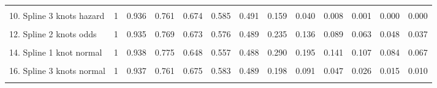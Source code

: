 \documentclass[
]{article}
\begin{document}
\begin{table}
{\begin{tabular}[t]{lrrrrrrrrrrrr}
\cellcolor{gray!6}{9. Spline 2 knots hazard} & \cellcolor{gray!6}{1} & \cellcolor{gray!6}{0.935} & \cellcolor{gray!6}{0.766} & \cellcolor{gray!6}{0.673} & \cellcolor{gray!6}{0.579} & \cellcolor{gray!6}{0.490} & \cellcolor{gray!6}{0.184} & \cellcolor{gray!6}{0.061} & \cellcolor{gray!6}{0.018} & \cellcolor{gray!6}{0.005} & \cellcolor{gray!6}{0.001} & \cellcolor{gray!6}{0.000}\\
10. Spline 3 knots hazard & 1 & 0.936 & 0.761 & 0.674 & 0.585 & 0.491 & 0.159 & 0.040 & 0.008 & 0.001 & 0.000 & 0.000\\
\cellcolor{gray!6}{11. Spline 1 knot odds} & \cellcolor{gray!6}{1} & \cellcolor{gray!6}{0.939} & \cellcolor{gray!6}{0.778} & \cellcolor{gray!6}{0.648} & \cellcolor{gray!6}{0.556} & \cellcolor{gray!6}{0.489} & \cellcolor{gray!6}{0.301} & \cellcolor{gray!6}{0.213} & \cellcolor{gray!6}{0.162} & \cellcolor{gray!6}{0.131} & \cellcolor{gray!6}{0.109} & \cellcolor{gray!6}{0.093}\\
12. Spline 2 knots odds & 1 & 0.935 & 0.769 & 0.673 & 0.576 & 0.489 & 0.235 & 0.136 & 0.089 & 0.063 & 0.048 & 0.037\\
\cellcolor{gray!6}{13. Spline 3 knots odds} & \cellcolor{gray!6}{1} & \cellcolor{gray!6}{0.937} & \cellcolor{gray!6}{0.761} & \cellcolor{gray!6}{0.675} & \cellcolor{gray!6}{0.583} & \cellcolor{gray!6}{0.489} & \cellcolor{gray!6}{0.206} & \cellcolor{gray!6}{0.108} & \cellcolor{gray!6}{0.065} & \cellcolor{gray!6}{0.044} & \cellcolor{gray!6}{0.032} & \cellcolor{gray!6}{0.024}\\
14. Spline 1 knot normal & 1 & 0.938 & 0.775 & 0.648 & 0.557 & 0.488 & 0.290 & 0.195 & 0.141 & 0.107 & 0.084 & 0.067\\
\cellcolor{gray!6}{15. Spline 2 knots normal} & \cellcolor{gray!6}{1} & \cellcolor{gray!6}{0.930} & \cellcolor{gray!6}{0.773} & \cellcolor{gray!6}{0.669} & \cellcolor{gray!6}{0.572} & \cellcolor{gray!6}{0.489} & \cellcolor{gray!6}{0.240} & \cellcolor{gray!6}{0.135} & \cellcolor{gray!6}{0.083} & \cellcolor{gray!6}{0.054} & \cellcolor{gray!6}{0.037} & \cellcolor{gray!6}{0.027}\\
16. Spline 3 knots normal & 1 & 0.937 & 0.761 & 0.675 & 0.583 & 0.489 & 0.198 & 0.091 & 0.047 & 0.026 & 0.015 & 0.010\\
\cellcolor{gray!6}{17. Mixture cure Weibull} & \cellcolor{gray!6}{1} & \cellcolor{gray!6}{0.928} & \cellcolor{gray!6}{0.804} & \cellcolor{gray!6}{0.676} & \cellcolor{gray!6}{0.563} & \cellcolor{gray!6}{0.475} & \cellcolor{gray!6}{0.319} & \cellcolor{gray!6}{0.310} & \cellcolor{gray!6}{0.309} & \cellcolor{gray!6}{0.309} & \cellcolor{gray!6}{0.309} & \cellcolor{gray!6}{0.309}\\

\end{tabular}}
\end{table}
\end{document}
